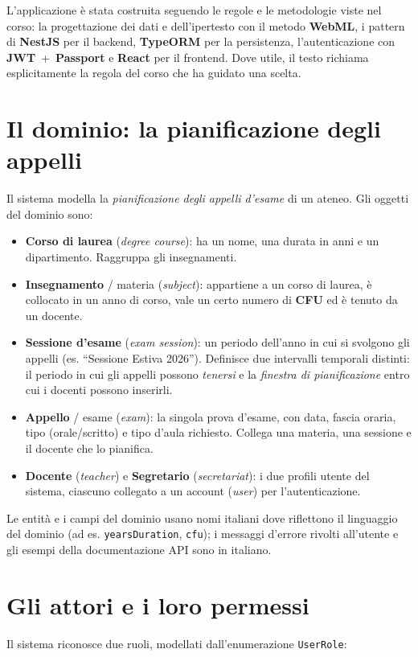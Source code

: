 \documentclass[11pt,a4paper,oneside]{report}
\newcommand{\code}[1]{\texttt{\small #1}}
\begin{document}
L'applicazione è stata costruita seguendo le regole e le metodologie viste nel
corso: la progettazione dei dati e dell'ipertesto con il metodo \textbf{WebML},
i pattern di \textbf{NestJS} per il backend, \textbf{TypeORM} per la
persistenza, l'autenticazione con \textbf{JWT}~+~\textbf{Passport} e
\textbf{React} per il frontend. Dove utile, il testo richiama esplicitamente la
regola del corso che ha guidato una scelta.

\section{Il dominio: la pianificazione degli appelli}
Il sistema modella la \emph{pianificazione degli appelli d'esame} di un ateneo.
Gli oggetti del dominio sono:

\begin{itemize}[leftmargin=1.4em]
  \item \textbf{Corso di laurea} (\emph{degree course}): ha un nome, una durata
        in anni e un dipartimento. Raggruppa gli insegnamenti.
  \item \textbf{Insegnamento} / materia (\emph{subject}): appartiene a un corso
        di laurea, è collocato in un anno di corso, vale un certo numero di
        \textbf{CFU} ed è tenuto da un docente.
  \item \textbf{Sessione d'esame} (\emph{exam session}): un periodo dell'anno in
        cui si svolgono gli appelli (es. ``Sessione Estiva 2026''). Definisce
        due intervalli temporali distinti: il periodo in cui gli appelli possono
        \emph{tenersi} e la \emph{finestra di pianificazione} entro cui i docenti
        possono inserirli.
  \item \textbf{Appello} / esame (\emph{exam}): la singola prova d'esame, con
        data, fascia oraria, tipo (orale/scritto) e tipo d'aula richiesto.
        Collega una materia, una sessione e il docente che lo pianifica.
  \item \textbf{Docente} (\emph{teacher}) e \textbf{Segretario}
        (\emph{secretariat}): i due profili utente del sistema, ciascuno
        collegato a un account (\emph{user}) per l'autenticazione.
\end{itemize}

Le entità e i campi del dominio usano nomi italiani dove riflettono il
linguaggio del dominio (ad es. \code{yearsDuration}, \code{cfu}); i messaggi
d'errore rivolti all'utente e gli esempi della documentazione API sono in
italiano.

\section{Gli attori e i loro permessi}
Il sistema riconosce due ruoli, modellati dall'enumerazione \code{UserRole}:
\end{document}
